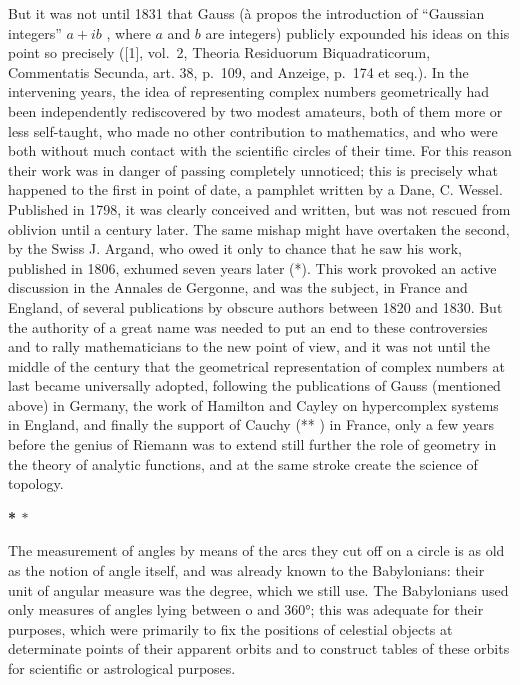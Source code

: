 But it was not until 1831 that Gauss (à propos the introduction of ``Gaussian integers'' \(a + ib\) , where \(a\) and \(b\) are integers) publicly expounded his ideas on this point so precisely ({[}1{]}, vol.~2, Theoria Residuorum Biquadraticorum, Commentatis Secunda, art. 38, p.~109, and Anzeige, p.~174 et seq.). In the intervening years, the idea of representing complex numbers geometrically had been independently rediscovered by two modest amateurs, both of them more or less self-taught, who made no other contribution to mathematics, and who were both without much contact with the scientific circles of their time. For this reason their work was in danger of passing completely unnoticed; this is precisely what happened to the first in point of date, a pamphlet written by a Dane, C. Wessel. Published in 1798, it was clearly conceived and written, but was not rescued from oblivion until a century later. The same mishap might have overtaken the second, by the Swiss J. Argand, who owed it only to chance that he saw his work, published in 1806, exhumed seven years later (*). This work provoked an active discussion in the Annales de Gergonne, and was the subject, in France and England, of several publications by obscure authors between 1820 and 1830. But the authority of a great name was needed to put an end to these controversies and to rally mathematicians to the new point of view, and it was not until the middle of the century that the geometrical representation of complex numbers at last became universally adopted, following the publications of Gauss (mentioned above) in Germany, the work of Hamilton and Cayley on hypercomplex systems in England, and finally the support of Cauchy (** ) in France, only a few years before the genius of Riemann was to extend still further the role of geometry in the theory of analytic functions, and at the same stroke create the science of topology.

\par\noindent\textbf{* \(\ast\)}\par

The measurement of angles by means of the arcs they cut off on a circle is as old as the notion of angle itself, and was already known to the Babylonians: their unit of angular measure was the degree, which we still use. The Babylonians used only measures of angles lying between o and 360°; this was adequate for their purposes, which were primarily to fix the positions of celestial objects at determinate points of their apparent orbits and to construct tables of these orbits for scientific or astrological purposes.

